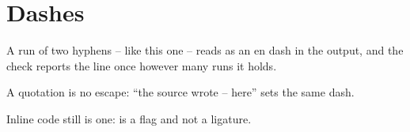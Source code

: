 \section{Dashes}
\label{sec:ch01-dashes}

A run of two hyphens -- like this one -- reads as an en dash in the output, and
the check reports the line once however many runs it holds.

A quotation is no escape: \enquote{the source wrote -- here} sets the same dash.

Inline code still is one:  is a flag and not a ligature.
